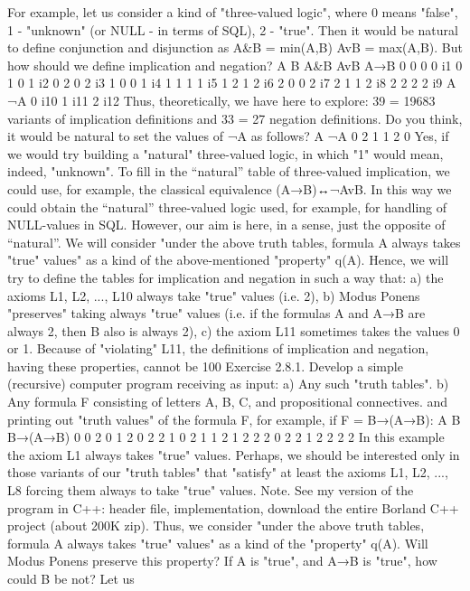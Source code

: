 For example, let us consider a kind of "three-valued logic", where 0 means "false", 1 - "unknown" (or
NULL - in terms of SQL), 2 - "true". Then it would be natural to define conjunction and disjunction as
A&B = min(A,B)
AvB = max(A,B).
But how should we define implication and negation?
A B A&B AvB A→B
0 0 0 0 i1
0 1 0 1 i2
0 2 0 2 i3
1 0 0 1 i4
1 1 1 1 i5
1 2 1 2 i6
2 0 0 2 i7
2 1 1 2 i8
2 2 2 2 i9
A ¬A
0 i10
1 i11
2 i12
Thus, theoretically, we have here to explore: 39 = 19683 variants of implication definitions and 33 = 27
negation definitions.
Do you think, it would be natural to set the values of ¬A as follows?
A ¬A
0 2
1 1
2 0
Yes, if we would try building a "natural" three-valued logic, in which "1" would mean, indeed,
"unknown". To fill in the “natural” table of three-valued implication, we could use, for example, the
classical equivalence (A→B)↔¬AvB. In this way we could obtain the “natural” three-valued logic used,
for example, for handling of NULL-values in SQL.
However, our aim is here, in a sense, just the opposite of “natural”. We will consider
"under the above truth tables, formula A always takes "true" values"
as a kind of the above-mentioned "property" q(A). Hence, we will try to define the tables for implication
and negation in such a way that:
a) the axioms L1, L2, ..., L10 always take "true" values (i.e. 2),
b) Modus Ponens "preserves" taking always "true" values (i.e. if the formulas A and A→B are always 2,
then B also is always 2),
c) the axiom L11 sometimes takes the values 0 or 1.
Because of "violating" L11, the definitions of implication and negation, having these properties, cannot be
100%
Exercise 2.8.1. Develop a simple (recursive) computer program receiving as input:
a) Any such "truth tables".
b) Any formula F consisting of letters A, B, C, and propositional connectives.
and printing out "truth values" of the formula F, for example, if F = B→(A→B):
A B B→(A→B)
0 0 2
0 1 2
0 2 2
1 0 2
1 1 2
1 2 2
2 0 2
2 1 2
2 2 2
In this example the axiom L1 always takes "true" values. Perhaps, we should be interested only in those
variants of our "truth tables" that "satisfy" at least the axioms L1, L2, ..., L8 forcing them always to take
"true" values.
Note. See my version of the program in C++: header file, implementation, download the entire Borland C++ project (about
200K zip).
Thus, we consider
"under the above truth tables, formula A always takes "true" values"
as a kind of the "property" q(A).
Will Modus Ponens preserve this property? If A is "true", and A→B is "true", how could B be not? Let us

